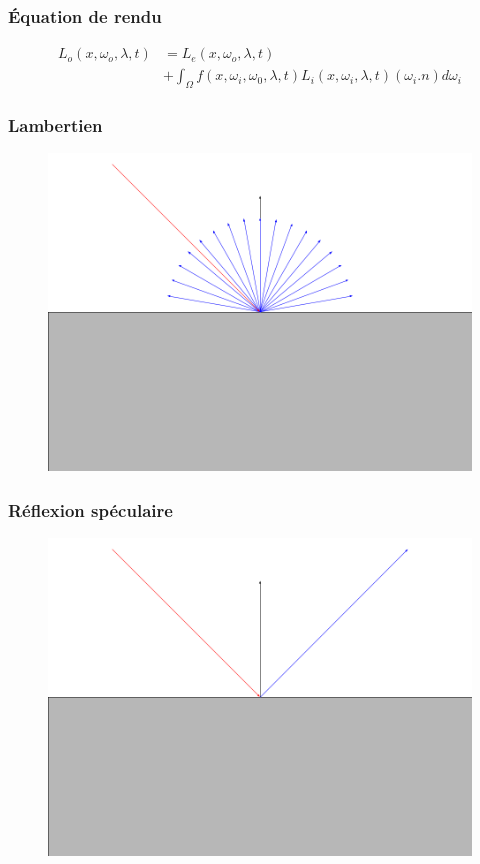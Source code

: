 \documentclass[handout]{beamer}
\begin{document}
\begin{frame}

    \frametitle{Équation de rendu}

    \begin{align*}
        L_o(x, \omega_o, \lambda, t)
        &= L_e(x, \omega_o, \lambda, t) \\
        &+ \int_{\Omega}^{} f(x, \omega_i, \omega_0, \lambda, t)
        L_i(x, \omega_i, \lambda, t)
        (\omega_i . n) d\omega_i
    \end{align*}

\end{frame}

\begin{frame}
    \frametitle{Lambertien}
    \begin{figure}
        \includegraphics[scale=0.3]{Lambertian.png}
    \end{figure}
\end{frame}

\begin{frame}
    \frametitle{Réflexion spéculaire}
    \begin{figure}
        \includegraphics[scale=0.3]{Metal.png}
    \end{figure}
\end{frame}
\end{document}
